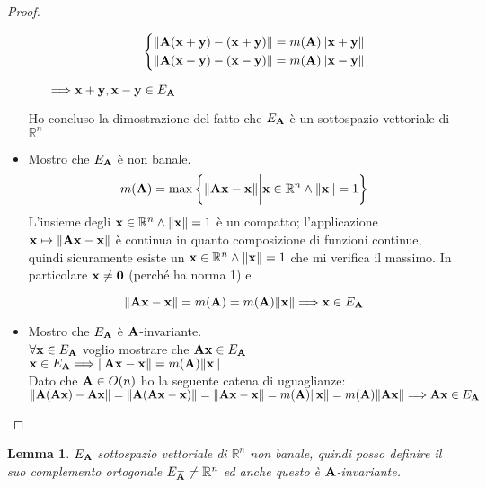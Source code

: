 \documentclass[10pt,a4paper]{article}
\newtheorem{lemma}[theorem]{Lemma}
\begin{document}
\begin{proof}
\begin{itemize}
\begin{itemize}
\begin{equation*}
  \left\{
    \begin{aligned}
      & \norm{\vb{A(x+y) - (x+y)}} = m(\vb{A})\norm{\vb{x+y}} \\
      & \norm{\vb{A(x-y) - (x-y)}} = m(\vb{A})\norm{\vb{x-y}} 
    \end{aligned}
  \right.
\end{equation*}

$\Longrightarrow \vb{x+y, x-y} \in E_{\vb{A}} $ 
\end{itemize}  
Ho concluso la dimostrazione del fatto che $E_{\vb{A}}$ è un sottospazio vettoriale di $\mathbb{R}^n $

\item Mostro che $E_{\vb{A}}$ è non banale. 
\[ m(\vb{A}) = \max \bigg\{ \norm{\vb{Ax-x}} \bigg|  \vb{x} \in \mathbb{R}^{n} \land \norm{\vb{x}} = 1 \bigg\} \] 
 L'insieme degli $\vb{x} \in \mathbb{R}^{n} \land \norm{\vb{x}} = 1$ è un compatto; l'applicazione $ \vb{x} \mapsto \norm{\vb{Ax-x}}$ è continua in quanto composizione di funzioni continue, quindi sicuramente esiste un $\vb{x} \in \mathbb{R}^{n} \land \norm{\vb{x}} = 1$  che mi verifica il massimo. In particolare $\vb{x} \neq \vb{0}$  (perché ha norma 1) e 

\[ \norm{\vb{Ax - x}} = m(\vb{A}) = m(\vb{A})\norm{\vb{x}} \Longrightarrow \vb{x} \in E_{\vb{A}}\]


\item Mostro che $E_{\vb{A}}$ è $\vb{A}$-invariante. \\
$\forall \vb{x} \in E_{\vb{A}}$  voglio mostrare che $\vb{Ax} \in E_{\vb{A}}$ \\
$\vb{x} \in E_{\vb{A}} \Longrightarrow \norm{\vb{Ax-x}} = m(\vb{A})\norm{\vb{x}} $ \\
Dato che $\vb{A} \in O(n)$ ho la seguente catena di uguaglianze:\\
$ \norm{\vb{A(Ax) - Ax }} =  \norm{\vb{A(Ax-x)}} = \norm{\vb{Ax - x}} = m(\vb{A})\norm{\vb{x}} = m(\vb{A})\norm{\vb{Ax}} \Longrightarrow \vb{Ax} \in E_{\vb{A}}$
\end{itemize} 
\end{proof}



\begin{lemma}
$E_{\vb{A}}$ sottospazio vettoriale di $\mathbb{R}^n $ non banale, quindi posso definire il suo complemento ortogonale $E^{\perp}_{\vb{A}} \neq \mathbb{R}^n$ ed anche questo è $\vb{A}$-invariante. 
\end{lemma} 
\end{document}
